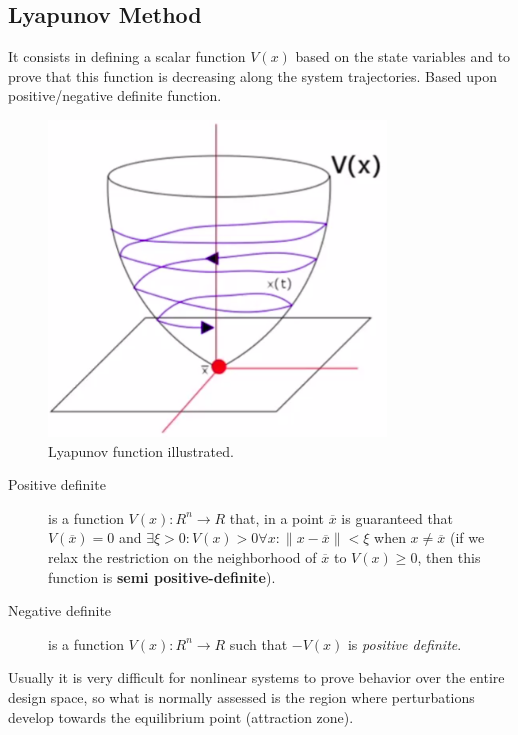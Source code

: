 \subsection*{Lyapunov Method}

It consists in defining a scalar function $V\left( x \right) $ based on the state variables and to prove that this function is decreasing along the system trajectories. Based upon positive/negative definite function.

\begin{figure}[h!]
    \centering
    \includegraphics[width=0.8\textwidth]{figures/lyapunov_function.png}
    \caption{Lyapunov function illustrated.}
    \label{fig:figures-lyapunov_function-png}
\end{figure}

\begin{description}
    \item[Positive definite] is a function $V\left( x \right) :R^{n}\to R$ that, in a point $\overline{x}$ is guaranteed that $V\left( \overline{x} \right) =0$ and  $\exists \xi>0:V\left( x \right) >0 \forall x:\|x-\overline{x}\|<\xi$ when $x\neq \overline{x}$ (if we relax the restriction on the neighborhood of $\overline{x}$ to $V(x) \ge 0$, then this function is \textbf{semi positive-definite}).
    \item[Negative definite] is a function $V\left( x \right) :R^{n}\to R$ such that $-V(x)$ is \emph{positive definite}.
\end{description}

 Usually it is very difficult for nonlinear systems to prove behavior over the entire design space, so what is normally assessed is the region where perturbations develop towards the equilibrium point (attraction zone).

